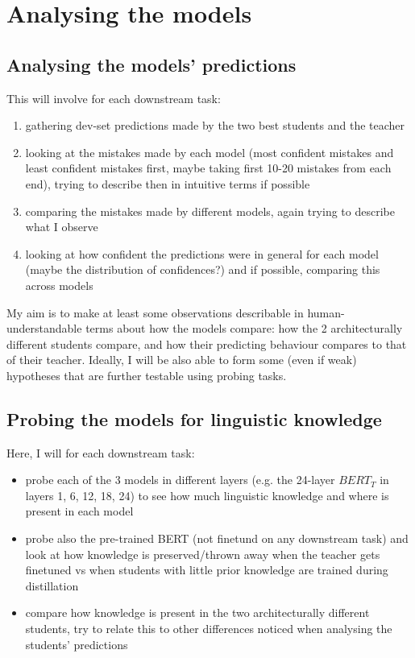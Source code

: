 \documentclass[bsc,frontabs,twoside,singlespacing,parskip,deptreport]{infthesis}
\begin{document}
\chapter{Analysing the models}{
  \section{Analysing the models' predictions}{
    This will involve for each downstream task:
    \begin{enumerate}
      \item gathering dev-set predictions made by the two best students and the teacher
      \item looking at the mistakes made by each model (most confident mistakes and least confident mistakes first, maybe taking first 10-20 mistakes from each end), trying to describe then in intuitive terms if possible
      \item comparing the mistakes made by different models, again trying to describe what I observe
      \item looking at how confident the predictions were in general for each model (maybe the distribution of confidences?) and if possible, comparing this across models
    \end{enumerate}

    My aim is to make at least some observations describable in human-understandable terms about how the models compare: how the 2 architecturally different students compare, and how their predicting behaviour compares to that of their teacher.
    Ideally, I will be also able to form some (even if weak) hypotheses that are further testable using probing tasks.
  }

  \section{Probing the models for linguistic knowledge}{
    Here, I will for each downstream task:
    \begin{itemize}
      \item probe each of the 3 models in different layers (e.g. the 24-layer $BERT_T$ in layers 1, 6, 12, 18, 24) to see how much linguistic knowledge and where is present in each model
      \item probe also the pre-trained BERT (not finetund on any downstream task) and look at how knowledge is preserved/thrown away when the teacher gets finetuned vs when students with little prior knowledge are trained during distillation
      \item compare how knowledge is present in the two architecturally different students, try to relate this to other differences noticed when analysing the students' predictions
    \end{itemize}

}}
\end{document}
